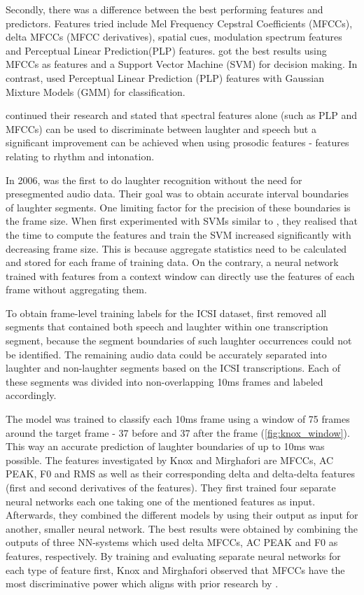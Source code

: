 \documentclass[bsc,frontabs,parskip,deptreport]{infthesis}
\begin{document}
Secondly, there was a difference between the best performing features and predictors.  
Features tried include Mel Frequency Cepstral Coefficients (MFCCs), delta MFCCs (MFCC derivatives), spatial cues, modulation spectrum features and Perceptual Linear Prediction(PLP) features. 
\citet{kennedy2004laughter} got the best results using MFCCs as features and a Support Vector Machine (SVM) for decision making.
In contrast, \citet{truong2005automatic} used Perceptual Linear Prediction (PLP) features with Gaussian Mixture Models (GMM) for classification. 

\citet{truong2007automatic} continued their research and stated that spectral features alone (such as PLP and MFCCs) can be used to discriminate between laughter and speech but a significant improvement can be achieved when using prosodic features - features relating to rhythm and intonation.

In 2006, \citet{knox2006automatic} was the first to do laughter recognition without the need for presegmented audio data.  
Their goal was to obtain accurate interval boundaries of laughter segments.
One limiting factor for the precision of these boundaries is the frame size. 
When \citet{knox2006automatic} first experimented with SVMs similar to \citet{kennedy2004laughter}, they realised that the time to compute the features and train the SVM increased significantly with decreasing frame size. 
This is because aggregate statistics need to be calculated and stored for each frame of training data.  
On the contrary, a neural network trained with features from a context window can directly use the features of each frame without aggregating them.  

To obtain frame-level training labels for the ICSI dataset, \citet{knox2006automatic} first removed all segments that contained both speech and laughter within one transcription segment, because the segment boundaries of such laughter occurrences could not be identified. 
The remaining audio data could be accurately separated into laughter and non-laughter segments based on the ICSI transcriptions. Each of these segments was divided into non-overlapping 10ms frames and labeled accordingly.

The model was trained to classify each 10ms frame using a window of 75 frames around the target frame - 37 before and 37 after the frame (\autoref{fig:knox_window}).
This way an accurate prediction of laughter boundaries of up to 10ms was possible. 
The features investigated by Knox and Mirghafori are MFCCs, AC PEAK, F0 and RMS as well as their corresponding delta and delta-delta features (first and second derivatives of the features).
They first trained four separate neural networks each one taking one of the mentioned features as input.
Afterwards, they combined the different models by using their output as input for another, smaller neural network.
The best results were obtained by combining the outputs of three NN-systems which used delta MFCCs, AC PEAK and F0 as features, respectively.
By training and evaluating separate neural networks for each type of feature first, Knox and Mirghafori observed that MFCCs have the most discriminative power which aligns with prior research by \citet{kennedy2004laughter}.
\end{document}
